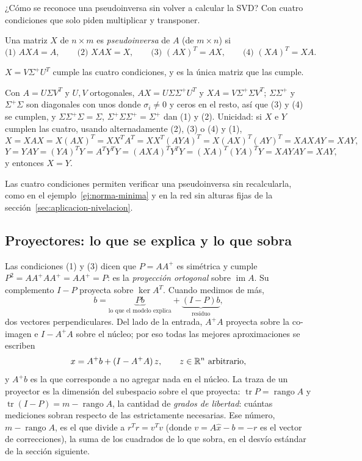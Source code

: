 ¿Cómo se reconoce una pseudoinversa sin volver a calcular la SVD? Con cuatro condiciones que
solo piden multiplicar y transponer.

\begin{definicion}\label{def:moore-penrose}
Una matriz \(X\) de \(n\times m\) es \emph{pseudoinversa} de \(A\) (de \(m\times n\)) si
\[
  \text{(1) } AXA=A,\qquad \text{(2) } XAX=X,\qquad
  \text{(3) } (AX)^T=AX,\qquad \text{(4) } (XA)^T=XA .
\]
\end{definicion}

\begin{proposicion}\label{prop:moore-penrose}
\(X=V\Sigma^{+}U^T\) cumple las cuatro condiciones, y es la única matriz que las cumple.
\end{proposicion}

\begin{demostracion}
Con \(A=U\Sigma V^T\) y \(U,V\) ortogonales, \(AX=U\Sigma\Sigma^{+}U^T\) y
\(XA=V\Sigma^{+}\Sigma V^T\); \(\Sigma\Sigma^{+}\) y \(\Sigma^{+}\Sigma\) son diagonales con
unos donde \(\sigma_i\neq0\) y ceros en el resto, así que (3) y (4) se cumplen, y
\(\Sigma\Sigma^{+}\Sigma=\Sigma\), \(\Sigma^{+}\Sigma\Sigma^{+}=\Sigma^{+}\) dan (1) y (2).
Unicidad: si \(X\) e \(Y\) cumplen las cuatro, usando alternadamente (2), (3) o (4) y (1),
\[
  X=XAX=X(AX)^T=XX^TA^T=XX^T(AYA)^T=X(AX)^T(AY)^T=XAXAY=XAY,
\]
\[
  Y=YAY=(YA)^TY=A^TY^TY=(AXA)^TY^TY=(XA)^T(YA)^TY=XAYAY=XAY,
\]
y entonces \(X=Y\).
\end{demostracion}

Las cuatro condiciones permiten verificar una pseudoinversa sin recalcularla, como en el
ejemplo~\ref{ej:norma-minima} y en la red sin alturas fijas de la
sección~\ref{sec:aplicacion-nivelacion}.

\subsection{Proyectores: lo que se explica y lo que sobra}\label{sec:proyectores}

Las condiciones (1) y (3) dicen que \(P=AA^{+}\) es simétrica y cumple
\(P^2=AA^{+}AA^{+}=AA^{+}=P\): es la \emph{proyección ortogonal} sobre
\(\operatorname{im}A\). Su complemento \(I-P\) proyecta sobre \(\ker A^T\). Cuando medimos de
más,
\[
  b=\underbrace{Pb}_{\text{lo que el modelo explica}}+\underbrace{(I-P)b}_{\text{residuo}},
\]
dos vectores perpendiculares. Del lado de la entrada, \(A^{+}A\) proyecta sobre la co-imagen
e \(I-A^{+}A\) sobre el núcleo; por eso todas las mejores aproximaciones se escriben
\[
  x=A^{+}b+(I-A^{+}A)\,z,\qquad z\in\R^n\ \text{arbitrario},
\]
y \(A^{+}b\) es la que corresponde a no agregar nada en el núcleo. La traza de un proyector
es la dimensión del subespacio sobre el que proyecta: \(\operatorname{tr}P=\operatorname{rango}A\) y
\(\operatorname{tr}(I-P)=m-\operatorname{rango}A\), la cantidad de \emph{grados de libertad}: cuántas mediciones
sobran respecto de las estrictamente necesarias. Ese
número, \(m-\operatorname{rango}A\), es el que divide a \(r^Tr=v^Tv\) (donde \(v=A\hat x-b=-r\) es el vector de correcciones), la suma de los cuadrados de lo que sobra, en el
desvío estándar de la sección siguiente.

